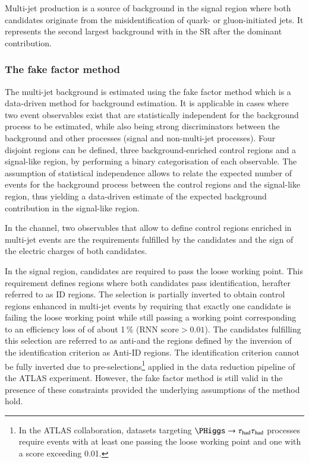 \label{sec:hadhad_multijet}

Multi-jet production is a source of background in the \hadhad signal
region where both \tauhadvis candidates originate from the
misidentification of quark- or gluon-initiated jets. It represents the
second largest background with \faketauhadvis in the \hadhad SR after
the dominant \ttbarFakes contribution.

\subsubsection{The fake factor method}

The multi-jet background is estimated using the fake factor method
which is a data-driven method for background estimation. It is
applicable in cases where two event observables exist that are
statistically independent for the background process to be estimated,
while also being strong discriminators between the background and
other processes (signal and non-multi-jet processes). Four disjoint
regions can be defined, three background-enriched control regions and
a signal-like region, by performing a binary categorisation of each
observable. The assumption of statistical independence allows to
relate the expected number of events for the background process
between the control regions and the signal-like region, thus yielding
a data-driven estimate of the expected background contribution in the
signal-like region.

In the \hadhad channel, two observables that allow to define control
regions enriched in multi-jet events are the \tauid requirements
fulfilled by the \tauhadvis candidates and the sign of the electric
charges of both candidates.

In the signal region, \tauhadvis candidates are required to pass the
loose \tauid working point. This requirement defines regions where
both \tauhadvis candidates pass identification, herafter referred to
as ID regions. The selection is partially inverted to obtain control
regions enhanced in multi-jet events by requiring that exactly one
\tauhadvis candidate is failing the loose \tauid working point while
still passing a working point corresponding to an efficiency loss of
\tauhad of about 1\,\% ($\text{RNN score} > 0.01$). The \tauhadvis
candidates fulfilling this selection are referred to as
anti-\tauhadvis and the regions defined by the inversion of the
identification criterion as Anti-ID regions. The identification
criterion cannot be fully inverted due to pre-selections\footnote{In
  the ATLAS collaboration, datasets targeting $\PHiggs \to \hadhad$
  processes require events with at least one \tauhadvis passing the
  loose \tauid working point and one \tauhadvis with a \tauid score
  exceeding 0.01.} applied in the data reduction pipeline of the ATLAS
experiment. However, the fake factor method is still valid in the
presence of these constraints provided the underlying assumptions of
the method hold.

